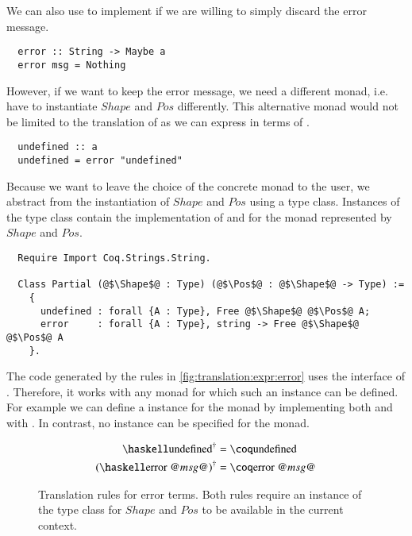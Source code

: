 We can also use  to implement  if we are willing to simply discard the error message.
\begin{verbatim}
  error :: String -> Maybe a
  error msg = Nothing
\end{verbatim}
However, if we want to keep the error message, we need a different monad, i.e. have to instantiate $Shape$ and $Pos$ differently.
This alternative monad would not be limited to the translation of  as we can express  in terms of .
\begin{verbatim}
  undefined :: a
  undefined = error "undefined"
\end{verbatim}

Because we want to leave the choice of the concrete monad to the user, we abstract from the instantiation of $Shape$ and $Pos$ using a type class.
Instances of the type class contain the implementation of  and  for the monad represented by $Shape$ and $Pos$.
\begin{verbatim}
  Require Import Coq.Strings.String.

  Class Partial (@$\Shape$@ : Type) (@$\Pos$@ : @$\Shape$@ -> Type) :=
    {
      undefined : forall {A : Type}, Free @$\Shape$@ @$\Pos$@ A;
      error     : forall {A : Type}, string -> Free @$\Shape$@ @$\Pos$@ A
    }.
\end{verbatim}
The code generated by the rules in \autoref{fig:translation:expr:error} uses the interface of .
Therefore, it works with any monad for which such an instance can be defined.
For example we can define a  instance for the  monad by implementing both  and  with .
In contrast, no  instance can be specified for the  monad.

\begin{figure}[H]
  \begin{align*}
    \toCoq{\haskellM{undefined}}       &= \coqM{undefined} \\
    \toCoq{(\haskellM{error @$msg$@})} &= \coqM{error @$msg$@}
  \end{align*}
  \caption{
    Translation rules for error terms.
    Both rules require an instance of the  type class for $Shape$ and $Pos$ to be available in the current context.
  }
  \label{fig:translation:expr:error}
\end{figure}

